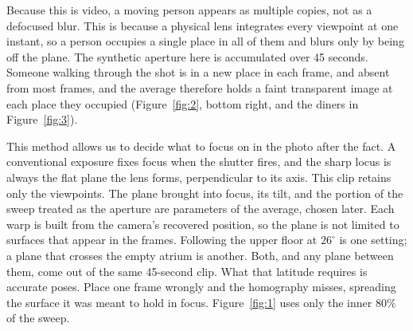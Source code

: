 \documentclass[11pt]{article}
\begin{document}
Because this is video, a moving person appears as multiple copies, not as a defocused blur. This is because a physical lens integrates every viewpoint at one instant, so a person occupies a single place in all of them and blurs only by being off the plane. The synthetic aperture here is accumulated over 45 seconds. Someone walking through the shot is in a new place in each frame, and absent from most frames, and the average therefore holds a faint transparent image at each place they occupied (Figure~\ref{fig:2}, bottom right, and the diners in Figure~\ref{fig:3}).

This method allows us to decide what to focus on in the photo after the fact. A conventional exposure fixes focus when the shutter fires, and the sharp locus is always the flat plane the lens forms, perpendicular to its axis. This clip retains only the viewpoints. The plane brought into focus, its tilt, and the portion of the sweep treated as the aperture are parameters of the average, chosen later. Each warp is built from the camera's recovered position, so the plane is not limited to surfaces that appear in the frames. Following the upper floor at $26^\circ$ is one setting; a plane that crosses the empty atrium is another. Both, and any plane between them, come out of the same 45-second clip. What that latitude requires is accurate poses. Place one frame wrongly and the homography misses, spreading the surface it was meant to hold in focus. Figure~\ref{fig:1} uses only the inner 80\% of the sweep.
\end{document}
